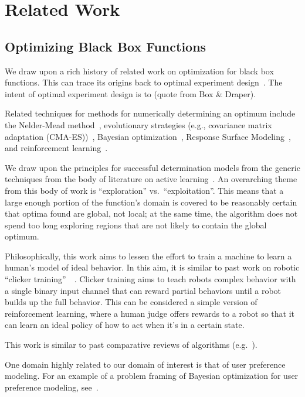\section{Related Work}

\subsection{Optimizing Black Box Functions}

We draw upon a rich history of related work on optimization for black box functions.
This can trace its origins back to optimal experiment design~\cite{box_empirical_1987}.
The intent of optimal experiment design is to (quote from Box \& Draper).

Related techniques for methods for numerically determining an optimum include 
the Nelder-Mead method~\cite{nelder_simplex_1965},
evolutionary strategies (e.g., covariance matrix adaptation (CMA-ES))~\cite{hansen_adapting_1996},
Bayesian optimization~\cite{brochu_tutorial_2010},
Response Surface Modeling~\cite{box_empirical_1987},
and reinforcement learning~\cite{sutton_reinforcement_1998}.

We draw upon the principles for successful determination models from the generic techniques from the body of literature on active learning~\cite{cohn_active_1996,settles_active_2010}.
An overarching theme from this body of work is ``exploration'' vs.\ ``exploitation''.
This means that a large enough portion of the function's domain is covered to be reasonably certain that optima found are global, not local;
at the same time, the algorithm does not spend too long exploring regions that are not likely to contain the global optimum.

Philosophically, this work aims to lessen the effort to train a machine to learn a human's model of ideal behavior.
In this aim, it is similar to past work on robotic ``clicker training''~\cite{kaplan_robotic_2002}~\cite{grollman_dogged_2007}.
Clicker training aims to teach robots complex behavior with a single binary input channel that can reward partial behaviors until a robot builds up the full behavior.
This can be considered a simple version of reinforcement learning, where a human judge offers rewards to a robot so that it can learn an ideal policy of how to act when it's in a certain state.

This work is similar to past comparative reviews of algorithms (e.g.~\cite{hansen_comparing_2010,mersmann_benchmarking_2010}).

One domain highly related to our domain of interest is that of user preference modeling.
For an example of a problem framing of Bayesian optimization for user preference modeling, see~\cite{brochu_tutorial_2010}.

